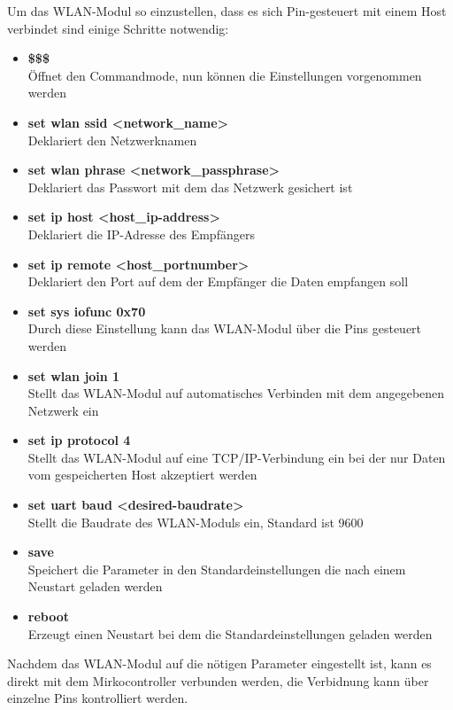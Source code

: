   Um das WLAN-Modul so einzustellen, dass es sich Pin-gesteuert mit einem Host verbindet sind einige Schritte notwendig:
  \begin{itemize}
    \item \textbf{\$\$\$}\\
    Öffnet den Commandmode, nun können die Einstellungen vorgenommen werden
    \item \textbf{set wlan ssid <network\_name>}\\
    Deklariert den Netzwerknamen
    \item \textbf{set wlan phrase <network\_passphrase>}\\
    Deklariert das Passwort mit dem das Netzwerk gesichert ist
    \item \textbf{set ip host <host\_ip-address>}\\
    Deklariert die IP-Adresse des Empfängers
    \item \textbf{set ip remote <host\_portnumber>}\\
    Deklariert den Port auf dem der Empfänger die Daten empfangen soll
    \item \textbf{set sys iofunc 0x70}\\
    Durch diese Einstellung kann das WLAN-Modul über die Pins gesteuert werden
    \item \textbf{set wlan join 1}\\
    Stellt das WLAN-Modul auf automatisches Verbinden mit dem angegebenen Netzwerk ein
    \item \textbf{set ip protocol 4}\\
    Stellt das WLAN-Modul auf eine TCP/IP-Verbindung ein bei der nur Daten vom gespeicherten Host akzeptiert werden
    \item \textbf{set uart baud <desired-baudrate>}\\
    Stellt die Baudrate des WLAN-Moduls ein, Standard ist 9600
    \item \textbf{save}\\
    Speichert die Parameter in den Standardeinstellungen die nach einem Neustart geladen werden
    \item \textbf{reboot}\\
    Erzeugt einen Neustart bei dem die Standardeinstellungen geladen werden
  \end{itemize}
  Nachdem das WLAN-Modul auf die nötigen Parameter eingestellt ist, kann es direkt mit dem Mirkocontroller verbunden werden, die Verbidnung kann über einzelne Pins kontrolliert
  werden.

